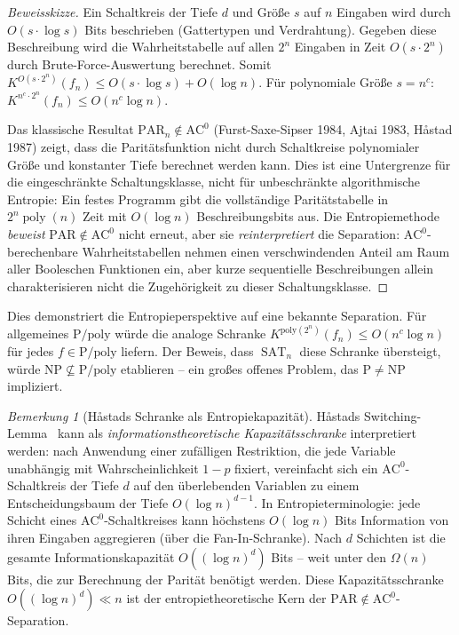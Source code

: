 \documentclass[aps,prd,twocolumn,superscriptaddress,nofootinbib]{revtex4-2}
\theoremstyle{definition}
\theoremstyle{remark}
\newtheorem{remark}[theorem]{Bemerkung}
\DeclareMathOperator{\poly}{poly}
\DeclareMathOperator{\SAT}{SAT}
\newcommand{\NP}{\mathrm{NP}}
\newcommand{\PP}{\mathrm{P}}
\begin{document}
\begin{proof}[Beweisskizze]
Ein Schaltkreis der Tiefe $d$ und Größe $s$ auf $n$ Eingaben wird durch $O(s \cdot \log s)$ Bits beschrieben (Gattertypen und Verdrahtung). Gegeben diese Beschreibung wird die Wahrheitstabelle auf allen $2^n$ Eingaben in Zeit $O(s \cdot 2^n)$ durch Brute-Force-Auswertung berechnet. Somit $K^{O(s \cdot 2^n)}(f_n) \leq O(s \cdot \log s) + O(\log n)$. Für polynomiale Größe $s = n^c$: $K^{n^c \cdot 2^n}(f_n) \leq O(n^c \log n)$.

Das klassische Resultat $\mathrm{PAR}_n \notin \mathrm{AC}^0$ (Furst-Saxe-Sipser 1984, Ajtai 1983, H\r{a}stad 1987) zeigt, dass die Paritätsfunktion nicht durch Schaltkreise polynomialer Größe und konstanter Tiefe berechnet werden kann. Dies ist eine Untergrenze für die eingeschränkte Schaltungsklasse,
nicht für unbeschränkte algorithmische Entropie: Ein festes Programm
gibt die vollständige Paritätstabelle in $2^n\poly(n)$ Zeit mit
$O(\log n)$ Beschreibungsbits aus.
Die Entropiemethode \textit{beweist} $\mathrm{PAR} \notin \mathrm{AC}^0$ nicht erneut, aber sie \textit{reinterpretiert} die Separation: $\mathrm{AC}^0$-berechenbare Wahrheitstabellen nehmen einen verschwindenden Anteil am Raum aller Booleschen Funktionen ein, aber kurze sequentielle Beschreibungen allein charakterisieren nicht die Zugehörigkeit zu dieser Schaltungsklasse.
\end{proof}

Dies demonstriert die Entropieperspektive auf eine bekannte Separation. Für allgemeines $\PP/\mathrm{poly}$ würde die analoge Schranke $K^{\mathrm{poly}(2^n)}(f_n) \leq O(n^c \log n)$ für jedes $f \in \PP/\mathrm{poly}$ liefern. Der Beweis, dass $\SAT_n$ diese Schranke übersteigt, würde $\NP \not\subseteq \PP/\mathrm{poly}$ etablieren -- ein großes offenes Problem, das $\PP \neq \NP$ impliziert.

\begin{remark}[H\r{a}stads Schranke als Entropiekapazität]
\label{rem:hastad-entropy}
H\r{a}stads Switching-Lemma~\cite{Hastad1987} kann als \emph{informationstheoretische Kapazitätsschranke} interpretiert werden: nach Anwendung einer zufälligen Restriktion, die jede Variable unabhängig mit Wahrscheinlichkeit $1-p$ fixiert, vereinfacht sich ein $\mathrm{AC}^0$-Schaltkreis der Tiefe $d$ auf den überlebenden Variablen zu einem Entscheidungsbaum der Tiefe $O(\log n)^{d-1}$. In Entropieterminologie: jede Schicht eines $\mathrm{AC}^0$-Schaltkreises kann höchstens $O(\log n)$ Bits Information von ihren Eingaben \glqq aggregieren\grqq{} (über die Fan-In-Schranke). Nach $d$ Schichten ist die gesamte Informationskapazität $O((\log n)^d)$ Bits -- weit unter den $\Omega(n)$ Bits, die zur Berechnung der Parität benötigt werden. Diese Kapazitätsschranke $O((\log n)^d) \ll n$ ist der entropietheoretische Kern der $\mathrm{PAR} \notin \mathrm{AC}^0$-Separation.
\end{remark}
\end{document}
